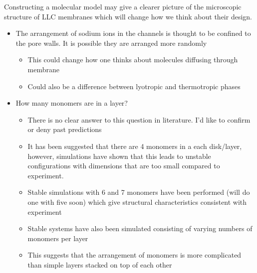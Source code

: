 \documentclass{article}
\begin{document}
	Constructing a molecular model may give a clearer picture of the microscopic structure of LLC membranes which will change how we think about their design.
	\begin{itemize}
		\item The arrangement of sodium ions in the channels is thought to be confined to the pore walls. It is possible they are arranged more randomly
		\begin{itemize}
			\item This could change how one thinks about molecules diffusing through membrane
			\item Could also be a difference between lyotropic and thermotropic phases
		\end{itemize}
		\item How many monomers are in a layer?

		\begin{itemize}
			\item There is no clear answer to this question in literature. I'd like to confirm or deny past predictions
			\item It has been suggested that there are 4 monomers in a each disk/layer, however, simulations have shown that this leads to unstable configurations with dimensions that are too small compared to experiment.
			\item Stable simulations with 6 and 7 monomers have been performed (will do one with five soon) which give structural characteristics consistent with experiment
			\item Stable systems have also been simulated consisting of varying numbers of monomers per layer
			\item This suggests that the arrangement of monomers is more complicated than simple layers stacked on top of each other
		\end{itemize}
	\end{itemize}
	
\end{document}
